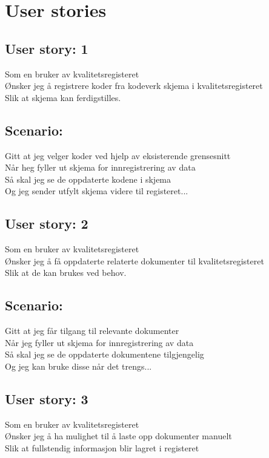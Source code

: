 \section{User stories}

\subsection{User story: 1}
Som en bruker av kvalitetsregisteret\\
Ønsker jeg å registrere koder fra kodeverk skjema i kvalitetsregisteret\\
Slik at skjema kan ferdigstilles.\\

\subsection*{Scenario:}
Gitt at jeg velger koder ved hjelp av eksisterende grensesnitt\\
Når heg fyller ut skjema for innregistrering av data\\
Så skal jeg se de oppdaterte kodene i skjema\\
Og jeg sender utfylt skjema videre til registeret...\\

\subsection{User story: 2}

Som en bruker av kvalitetsregisteret\\
Ønsker jeg å få oppdaterte relaterte dokumenter til kvalitetsregisteret\\
Slik at de kan brukes ved behov.\\

\subsection*{Scenario:}
Gitt at jeg får tilgang til relevante dokumenter\\
Når jeg fyller ut skjema for innregistrering av data\\
Så skal jeg se de oppdaterte dokumentene tilgjengelig\\
Og jeg kan bruke disse når det trengs...\\

\subsection{User story: 3}
Som en bruker av kvalitetsregisteret\\
Ønsker jeg å ha mulighet til å laste opp dokumenter manuelt\\
Slik at fullstendig informasjon blir lagret i registeret\\

